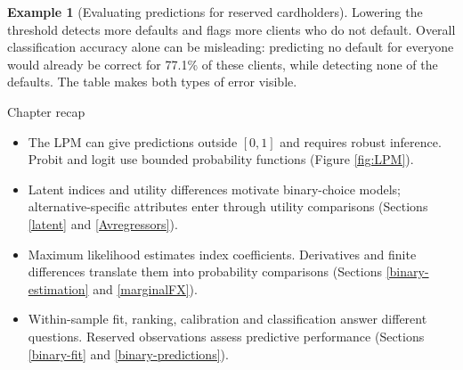 \documentclass[
  11pt,
]{book}
\makeatletter
\providecommand{\tightlist}{%
  \setlength{\itemsep}{0pt}\setlength{\parskip}{0pt}}
\renewcommand\section{\@startsection{section}{1}{\z@}
  {-3ex plus -1ex minus -.2ex}{1.3ex plus .2ex}
  {\normalfont\Large\bfseries\color{TextbookInk}}}
\theoremstyle{definition}
\theoremstyle{definition}
\newtheorem{example}{Example}[chapter]
\theoremstyle{definition}
\theoremstyle{definition}
\theoremstyle{remark}
\makeatother
\begin{document}
\begin{example}[Evaluating predictions for reserved cardholders]
\begin{table}[H]
\centering
\caption{\label{tab:credit-binary-classification}Logit classifications: true positives (TP), false positives (FP), false negatives (FN), and true negatives (TN).}
\centering
{}
\end{table}

Lowering the threshold detects more defaults and flags more clients who do not default. Overall classification accuracy alone can be misleading: predicting no default for everyone would already be correct for 77.1\% of these clients, while detecting none of the defaults. The table makes both types of error visible.
\end{example}


\section{Chapter recap}\label{binary-recap}

\begin{recapbox}

\begin{itemize}
\tightlist
\item
  The LPM can give predictions outside \([0,1]\) and requires robust inference. Probit and logit use bounded probability functions (Figure \ref{fig:LPM}).
\item
  Latent indices and utility differences motivate binary-choice models; alternative-specific attributes enter through utility comparisons (Sections \ref{latent} and \ref{Avregressors}).
\item
  Maximum likelihood estimates index coefficients. Derivatives and finite differences translate them into probability comparisons (Sections \ref{binary-estimation} and \ref{marginalFX}).
\item
  Within-sample fit, ranking, calibration and classification answer different questions. Reserved observations assess predictive performance (Sections \ref{binary-fit} and \ref{binary-predictions}).
\end{itemize}

\end{recapbox}
\end{document}
